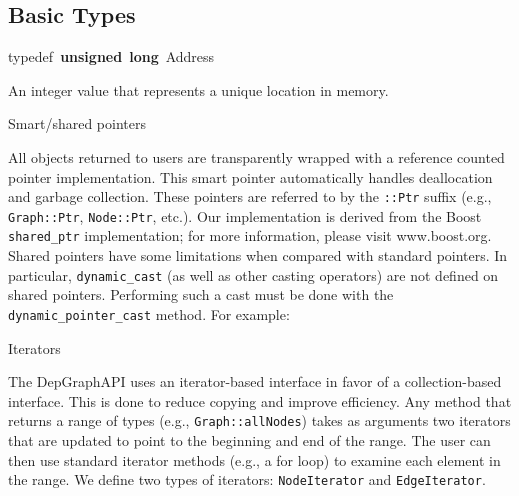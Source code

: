 \documentclass[12pt,titlepage]{article}
\begin{document}
\subsection{Basic Types}

{\ttfamily \raggedright \small
typedef\ \textbf{unsigned}\ \textbf{long}\ Address\\
 }
\normalfont\normalsize
\indent An integer value that represents a unique location in memory.

\noindent Smart/shared pointers

All objects returned to users are transparently wrapped with a
reference counted pointer implementation. This smart pointer
automatically handles deallocation and garbage collection. These
pointers are referred to by the \texttt{::Ptr} suffix (e.g., \texttt{Graph::Ptr},
\texttt{Node::Ptr}, etc.). Our implementation is derived from the Boost
\texttt{shared\_ptr} implementation; for more information, please visit
www.boost.org. Shared pointers have some limitations when compared
with standard pointers. In particular, \texttt{dynamic\_cast} (as well as other
casting operators) are not defined on shared pointers. Performing such
a cast must be done with the \texttt{dynamic\_pointer\_cast} method. For example:

\normalfont\normalsize

\noindent Iterators 

The DepGraphAPI uses an iterator-based interface in favor of a
collection-based interface. This is done to reduce copying and improve
efficiency. Any method that returns a range of types (e.g.,
\texttt{Graph::allNodes}) takes as arguments two iterators that are updated to
point to the beginning and end of the range. The user can then use
standard iterator methods (e.g., a for loop) to examine each element
in the range. We define two types of iterators: \texttt{NodeIterator} and
\texttt{EdgeIterator}.
\end{document}
